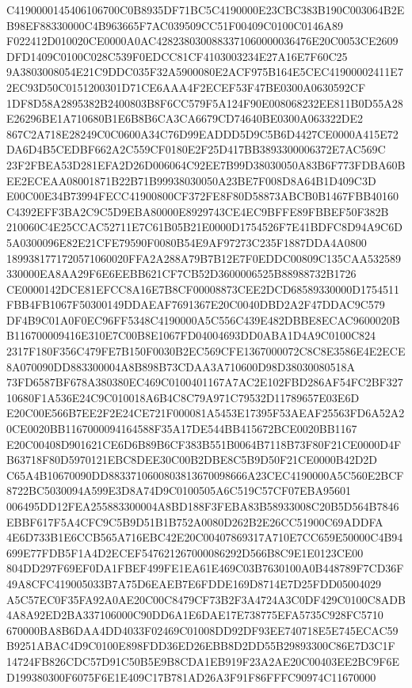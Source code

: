 \documentclass[UTF8,fontset=fandol,zihao=-4,a4paper]{ctexart}
\begin{document}
{{C4190000145406106700C0B8935DF71BC5C4190000E23CBC383B190C003064B2EB98EF88330000C4B963665F7AC039509CC51F00409C0100C0146A89
F022412D010020CE0000A0AC4282380300883371060000036476E20C0053CE2609DFD1409C0100C028C539F0EDCC81CF4103003234E27A16E7F60C25
9A3803008054E21C9DDC035F32A5900080E2ACF975B164E5CEC41900002411E72EC93D50C0151200301D71CE6AAA4F2ECEF53F47BE0300A0630592CF
1DF8D58A2895382B2400803B8F6CC579F5A124F90E008068232EE811B0D55A28E26296BE1A710680B1E6B8B6CA3CA6679CD74640BE0300A063322DE2
867C2A718E28249C0C0600A34C76D99EADDD5D9C5B6D4427CE0000A415E72DA6D4B5CEDBF662A2C559CF0180E2F25D417BB3893300006372E7AC569C
23F2FBEA53D281EFA2D26D006064C92EE7B99D38030050A83B6F773FDBA60BEE2ECEAA08001871B22B71B99938030050A23BE7F008D8A64B1D409C3D
E00C00E34B73994FECC41900800CF372FE8F80D58873ABCB0B1467FBB40160C4392EFF3BA2C9C5D9EBA80000E8929743CE4EC9BFFE89FBBEF50F382B
210060C4E25CCAC52711E7C61B05B21E0000D1754526F7E41BDFC8D94A9C6D5A0300096E82E21CFE79590F0080B54E9AF97273C235F1887DDA4A0800
1899381771720571060020FFA2A288A79B7B12E7F0EDDC00809C135CAA532589330000EA8AA29F6E6EEBB621CF7CB52D3600006525B88988732B1726
CE0000142DCE81EFCC8A16E7B8CF00008873CEE2DCD68589330000D1754511FBB4FB1067F50300149DDAEAF7691367E20C0040DBD2A2F47DDAC9C579
DF4B9C01A0F0EC96FF5348C4190000A5C556C439E482DBBE8ECAC9600020BB116700009416E310E7C00B8E1067FD04004693DD0ABA1D4A9C0100C824
2317F180F356C479FE7B150F0030B2EC569CFE1367000072C8C8E3586E4E2ECE8A070090DD883300004A8B898B73CDAA3A710600D98D38030080518A
73FD6587BF678A380380EC469C0100401167A7AC2E102FBD286AF54FC2BF32710680F1A536E24C9C010018A6B4C8C79A971C79532D11789657E03E6D
E20C00E566B7EE2F2E24CE721F000081A5453E17395F53AEAF25563FD6A52A20CE0020BB1167000094164588F35A17DE544BB415672BCE0020BB1167
E20C00408D901621CE6D6B89B6CF383B551B0064B7118B73F80F21CE0000D4FB63718F80D5970121EBC8DEE30C00B2DBE8C5B9D50F21CE0000B42D2D
C65A4B10670090DD8833710600803813670098666A23CEC4190000A5C560E2BCF8722BC5030094A599E3D8A74D9C0100505A6C519C57CF07EBA95601
006495DD12FEA255883300004A8BD188F3FEBA83B58933008C20B5D564B7846EBBF617F5A4CFC9C5B9D51B1B752A0080D262B2E26CC51900C69ADDFA
4E6D733B1E6CCB565A716EBC42E20C00407869317A710E7CC659E50000C4B94699E77FDB5F1A4D2ECEF547621267000086292D566B8C9E1E0123CE00
804DD297F69EF0DA1FBEF499FE1EA61E469C03B7630100A0B448789F7CD36F49A8CFC419005033B7A75D6EAEB7E6FDDE169D8714E7D25FDD05004029
A5C57EC0F35FA92A0AE20C00C8479CF73B2F3A4724A3C0DF429C0100C8ADB4A8A92ED2BA337106000C90DD6A1E6DAE17E738775EFA5735C928FC5710
670000BA8B6DAA4DD4033F02469C01008DD92DF93EE740718E5E745ECAC59B9251ABAC4D9C0100E898FDD36ED26EBB8D2DD55B29893300C86E7D3C1F
14724FB826CDC57D91C50B5E9B8CDA1EB919F23A2AE20C00403EE2BC9F6ED199380300F6075F6E1E409C17B781AD26A3F91F86FFFC90974C11670000
}}
\end{document}
